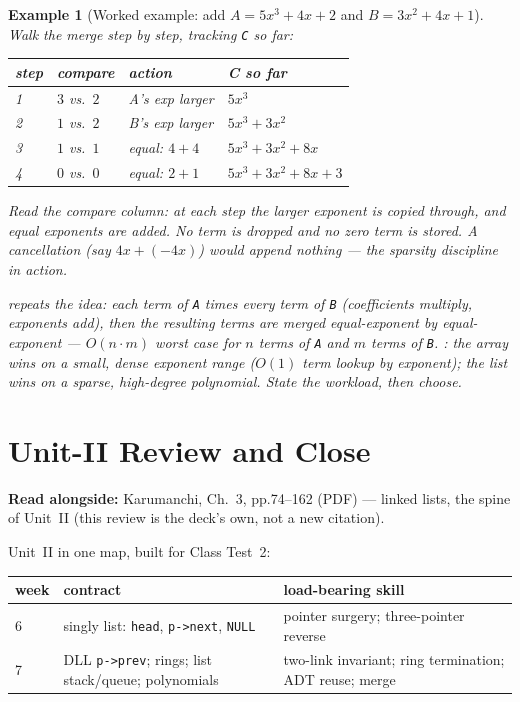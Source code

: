 \documentclass[11pt]{article}
\newtheorem{example}{Example}[section]
\begin{document}
\begin{example}[Worked example: add $A = 5x^{3} + 4x + 2$ and $B = 3x^{2} + 4x + 1$]
Walk the merge step by step, tracking \texttt{C} so far:

\begin{center}
{\small
\begin{tabular}{llll}
  \toprule
  \textbf{step} & \textbf{compare} & \textbf{action} & \textbf{C so far} \\
  \midrule
  1 & $3$ vs.\ $2$ & A's exp larger & $5x^{3}$ \\
  2 & $1$ vs.\ $2$ & B's exp larger & $5x^{3} + 3x^{2}$ \\
  3 & $1$ vs.\ $1$ & equal: $4 + 4$ & $5x^{3} + 3x^{2} + 8x$ \\
  4 & $0$ vs.\ $0$ & equal: $2 + 1$ & $5x^{3} + 3x^{2} + 8x + 3$ \\
  \bottomrule
\end{tabular}}
\end{center}

Read the compare column: at each step the larger exponent is copied through, and equal exponents are added. No term is dropped and no zero term is stored. A cancellation (say $4x + (-4x)$) would append \emph{nothing} --- the sparsity discipline in action.

 repeats the idea: each term of \texttt{A} times every term of \texttt{B} (coefficients multiply, exponents add), then the resulting terms are merged equal-exponent by equal-exponent --- $O(n \cdot m)$ worst case for $n$ terms of \texttt{A} and $m$ terms of \texttt{B}. : the array wins on a small, dense exponent range ($O(1)$ term lookup by exponent); the list wins on a sparse, high-degree polynomial. State the workload, then choose.
\end{example}

\section{Unit-II Review and Close}

\textbf{Read alongside:} Karumanchi, Ch.~3, pp.74--162 (PDF) --- linked lists, the spine of Unit~II (this review is the deck's own, not a new citation).

Unit~II in one map, built for Class Test~2:

\begin{center}
{\footnotesize
\begin{tabular}{@{}p{1.0cm} p{5.2cm} p{5.2cm}@{}}
  \toprule
  \textbf{week} & \textbf{contract} & \textbf{load-bearing skill} \\
  \midrule
  6 & singly list: \texttt{head}, \texttt{p->next}, \texttt{NULL} &
    pointer surgery; three-pointer reverse \\
  7 & DLL \texttt{p->prev}; rings; list stack/queue; polynomials &
    two-link invariant; ring termination; ADT reuse; merge \\
  \bottomrule
\end{tabular}}
\end{center}
\end{document}
